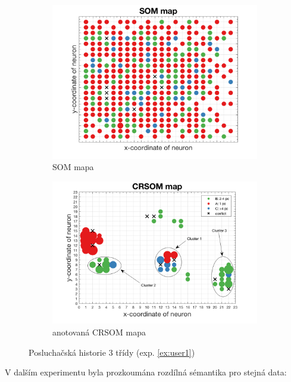 \documentclass[thesis=M,czech]{FITthesis}[2012/06/26]
\begin{document}
\begin{figure}
\centering
\begin{subfigure}{.5\textwidth}
  \centering
  \includegraphics[width=.99\linewidth]{exp_user_som.png}
  \caption{SOM mapa}
  \label{fig:usersom}
\end{subfigure}%
\begin{subfigure}{.5\textwidth}
  \centering
  \includegraphics[width=.99\linewidth]{exp_user_crsom_ann.png}
  \caption{anotovaná CRSOM mapa}
  \label{fig:usercrsom}
\end{subfigure}
\caption{Posluchačská historie $3$ třídy (exp. \ref{ex:user1})}
\label{fig:user1}
\end{figure}


V dalším experimentu byla prozkoumána rozdílná sémantika pro stejná data:
\end{document}
